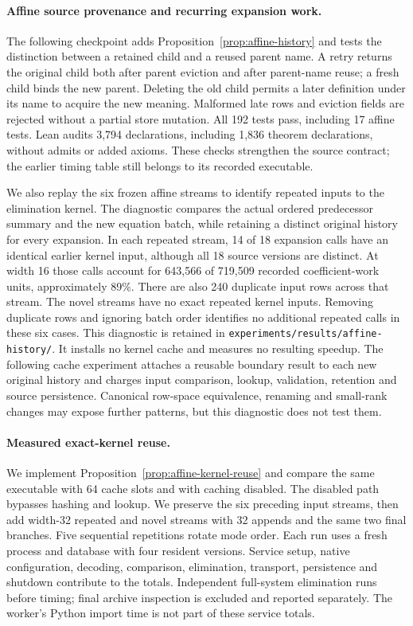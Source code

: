 \documentclass[11pt,a4paper]{article}
\numberwithin{equation}{section}
\theoremstyle{plain}
\theoremstyle{definition}
\theoremstyle{remark}
\begin{document}
\paragraph{Affine source provenance and recurring expansion work.}
The following checkpoint adds Proposition~\ref{prop:affine-history} and tests the distinction between a retained child and a reused parent name. A retry returns the original child both after parent eviction and after parent-name reuse; a fresh child binds the new parent. Deleting the old child permits a later definition under its name to acquire the new meaning. Malformed late rows and eviction fields are rejected without a partial store mutation. All 192 tests pass, including 17 affine tests. Lean audits 3,794 declarations, including 1,836 theorem declarations, without admits or added axioms. These checks strengthen the source contract; the earlier timing table still belongs to its recorded executable.

We also replay the six frozen affine streams to identify repeated inputs to the elimination kernel. The diagnostic compares the actual ordered predecessor summary and the new equation batch, while retaining a distinct original history for every expansion. In each repeated stream, 14 of 18 expansion calls have an identical earlier kernel input, although all 18 source versions are distinct. At width 16 those calls account for 643,566 of 719,509 recorded coefficient-work units, approximately 89\%. There are also 240 duplicate input rows across that stream. The novel streams have no exact repeated kernel inputs. Removing duplicate rows and ignoring batch order identifies no additional repeated calls in these six cases. This diagnostic is retained in \texttt{experiments/results/affine-history/}. It installs no kernel cache and measures no resulting speedup. The following cache experiment attaches a reusable boundary result to each new original history and charges input comparison, lookup, validation, retention and source persistence. Canonical row-space equivalence, renaming and small-rank changes may expose further patterns, but this diagnostic does not test them.

\paragraph{Measured exact-kernel reuse.}
We implement Proposition~\ref{prop:affine-kernel-reuse} and compare the same executable with 64 cache slots and with caching disabled. The disabled path bypasses hashing and lookup. We preserve the six preceding input streams, then add width-32 repeated and novel streams with 32 appends and the same two final branches. Five sequential repetitions rotate mode order. Each run uses a fresh process and database with four resident versions. Service setup, native configuration, decoding, comparison, elimination, transport, persistence and shutdown contribute to the totals. Independent full-system elimination runs before timing; final archive inspection is excluded and reported separately. The worker's Python import time is not part of these service totals.
\end{document}
